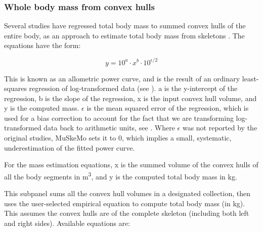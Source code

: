 \documentclass{article}
\begin{document}
\subsubsection{Whole body mass from convex hulls}

Several studies have regressed total body mass to summed convex hulls of the entire body, as an approach to estimate total body mass from skeletons \cite{brasseyScalingConvexHull2014,brasseyConvexhullMassEstimates2016,brasseyVolumetricTechniqueFossil2018,wrightVolumetricElementscalingMass2024}. The equations have the form:

\begin{equation}
y = 10^a \cdot x^{b} \cdot 10^{\epsilon /2}
\label{eq:powercurve}
\end{equation}


This is known as an allometric power curve, and is the result of an ordinary least-squares regression of log-transformed data (see \cite{alexanderPrinciplesAnimalLocomotion2006,brasseyScalingConvexHull2014}). a is the y-intercept of the regression, b is the slope of the regression, x is the input convex hull volume, and y is the computed mass.  \(\epsilon\) is the mean squared error of the regression, which is used for a bias correction to account for the fact that we are transforming log-transformed data back to arithmetic units, see \cite{baskervilleUseLogarithmicRegression1972,newmanRegressionAnalysisLogtransformed1993}. Where \(\epsilon\) was not reported by the original studies, MuSkeMo sets it to 0, which implies a small, systematic, underestimation of the fitted power curve.

For the mass estimation equations, x is the summed volume of the convex hulls of all the body segments in \si{m^3}, and y is the computed total body mass in \si{kg}.

This subpanel sums all the convex hull volumes in a designated collection, then uses the user-selected empirical equation to compute total body mass (in kg). This assumes the convex hulls are of the complete skeleton (including both left and right sides). Available equations are:
\end{document}
